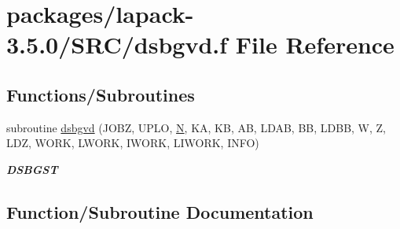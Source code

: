 \hypertarget{dsbgvd_8f}{}\section{packages/lapack-\/3.5.0/\+S\+R\+C/dsbgvd.f File Reference}
\label{dsbgvd_8f}
\subsection*{Functions/\+Subroutines}
\begin{DoxyCompactItemize}
\item 
subroutine \hyperlink{dsbgvd_8f_a5399550432eeee3ce0e4429f53bf4286}{dsbgvd} (J\+O\+B\+Z, U\+P\+L\+O, \hyperlink{polmisc_8c_a0240ac851181b84ac374872dc5434ee4}{N}, K\+A, K\+B, A\+B, L\+D\+A\+B, B\+B, L\+D\+B\+B, W, Z, L\+D\+Z, W\+O\+R\+K, L\+W\+O\+R\+K, I\+W\+O\+R\+K, L\+I\+W\+O\+R\+K, I\+N\+F\+O)
\begin{DoxyCompactList}\small\item\em {\bfseries D\+S\+B\+G\+S\+T} \end{DoxyCompactList}\end{DoxyCompactItemize}


\subsection{Function/\+Subroutine Documentation}
\hypertarget{dsbgvd_8f_a5399550432eeee3ce0e4429f53bf4286}{}
